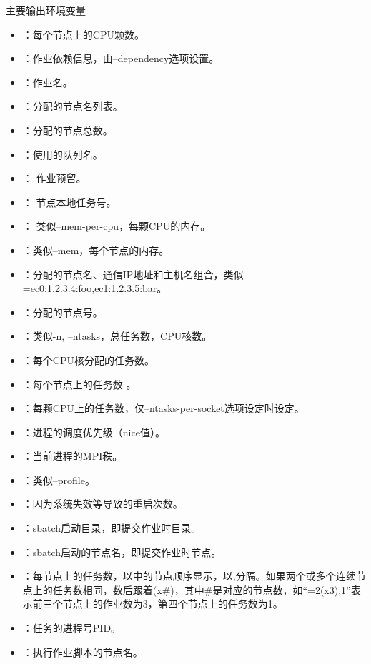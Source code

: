 \begin{frame}{主要输出环境变量}
\begin{itemize}
      \item {}：每个节点上的CPU颗数。
      \item {}：作业依赖信息，由--dependency选项设置。
      \item {}：作业名。
      \item {}：分配的节点名列表。
      \item {}：分配的节点总数。
      \item {}：使用的队列名。
      \item {}： 作业预留。
      \item {}： 节点本地任务号。
      \item {}： 类似--mem-per-cpu，每颗CPU的内存。
      \item {}：类似--mem，每个节点的内存。
      \item {}：分配的节点名、通信IP地址和主机名组合，类似\\=ec0:1.2.3.4:foo,ec1:1.2.3.5:bar。
      \item {}：分配的节点号。
      \item {}：类似-n, --ntasks，总任务数，CPU核数。
      \item {}：每个CPU核分配的任务数。
      \item {}：每个节点上的任务数 。
      \item {}：每颗CPU上的任务数，仅--ntasks-per-socket选项设定时设定。
      \item {}：进程的调度优先级（nice值）。
      \item {}：当前进程的MPI秩。
      \item {}：类似--profile。
      \item {}：因为系统失效等导致的重启次数。
      \item {}：sbatch启动目录，即提交作业时目录。
      \item {}：sbatch启动的节点名，即提交作业时节点。
      \item {}：每节点上的任务数，以中的节点顺序显示，以,分隔。如果两个或多个连续节点上的任务数相同，数后跟着(x\#)，其中\#是对应的节点数，如``=2(x3),1''表示前三个节点上的作业数为3，第四个节点上的任务数为1。
      \item {}：任务的进程号PID。
      \item {}：执行作业脚本的节点名。
\end{itemize}
\end{frame}

